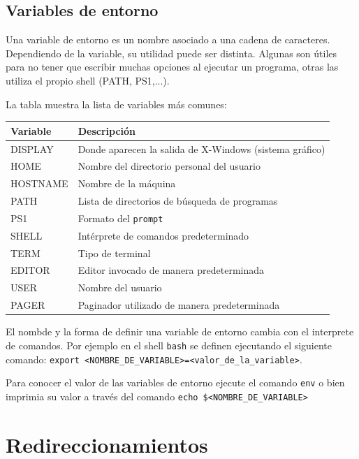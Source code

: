 \documentclass[12pt]{article}
\begin{document}
\subsection{Variables de entorno}

Una variable de entorno es un nombre asociado a una cadena de caracteres. Dependiendo de la variable, su utilidad puede ser distinta. 
Algunas son útiles para no tener que escribir muchas opciones al ejecutar un programa, otras las utiliza el propio shell (PATH, PS1,...). 

La tabla muestra la lista de variables más comunes:

\begin{center}
\begin{tabular}{|l|l|}\hline
Variable & Descripción \\\hline
DISPLAY & Donde aparecen la salida de X-Windows (sistema gráfico)\\\hline
HOME & Nombre del directorio personal del usuario\\\hline
HOSTNAME & Nombre de la máquina\\\hline
PATH & Lista de directorios de búsqueda de programas\\\hline
PS1 & Formato del \texttt{prompt}\\\hline
SHELL & Intérprete de comandos predeterminado\\\hline
TERM & Tipo de terminal\\\hline
EDITOR & Editor invocado de manera predeterminada\\\hline
USER & Nombre del usuario\\\hline
PAGER & Paginador utilizado de manera predeterminada\\\hline
\end{tabular}
\end{center}

El nombde y la forma de definir una variable de entorno cambia con el interprete de comandos.
Por ejemplo en el shell \texttt{bash} se definen ejecutando el siguiente comando: \texttt{export \textless NOMBRE\_DE\_VARIABLE\textgreater=\textless valor\_de\_la\_variable\textgreater}.

Para conocer el valor de las variables de entorno ejecute el comando \texttt{env} o bien imprimia su valor
a través del comando \texttt{echo \$\textless NOMBRE\_DE\_VARIABLE\textgreater}

\section{Redireccionamientos}
\end{document}
